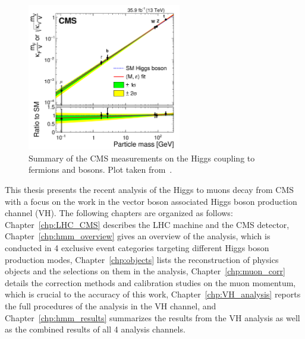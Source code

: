 \begin{figure}[!htb]
    \centering
    \captionsetup{justification=justified}
    \includegraphics[width=0.60\textwidth]{pics/Intro/higgs_coupling_2016.png}
    \caption{Summary of the CMS measurements on the Higgs coupling to fermions and bosons.
             Plot taken from~\cite{Sirunyan:2640611}. }
    \label{fig:higgs_2016}
\end{figure}


This thesis presents the recent analysis of the Higgs to muons decay from CMS 
with a focus on the work in the vector boson associated Higgs boson production channel (VH).
The following chapters are organized as follows:
Chapter~\ref{chp:LHC_CMS} describes the LHC machine and the CMS detector,
Chapter~\ref{chp:hmm_overview} gives an overview of the \hmm analysis, 
which is conducted in 4 exclusive event categories targeting different Higgs boson production modes,
Chapter~\ref{chp:objects} lists the reconstruction of physics objects and the selections on them in the analysis,
Chapter~\ref{chp:muon_corr} details the correction methods and calibration studies on the muon momentum, which is crucial to the accuracy of this work,
Chapter~\ref{chp:VH_analysis} reports the full procedures of the analysis in the VH channel,
and Chapter~\ref{chp:hmm_results} summarizes the results from the VH analysis 
as well as the combined results of all 4 analysis channels. 